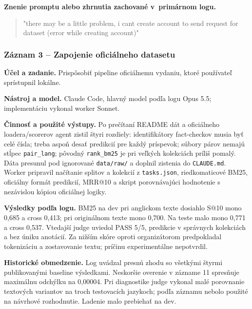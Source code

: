 \par\noindent\textbf{Znenie promptu alebo zhrnutia zachované v~primárnom logu.}

\begin{quote}\normalsize "there may be a little problem, i cant create account to send request for dataset (error while creating account)"\end{quote}

\subsubsection*{Záznam 3 -- Zapojenie oficiálneho datasetu}


\par\noindent \textbf{Účel a zadanie.} Prispôsobiť pipeline oficiálnemu vydaniu, ktoré používateľ sprístupnil lokálne.\par\smallskip
\par\noindent \textbf{Nástroj a model.} Claude Code, hlavný model podľa logu Opus 5.5; implementáciu vykonal worker Sonnet.\par\smallskip
\par\noindent \textbf{Činnosť a použité výstupy.} Po prečítaní README dát a oficiálneho loadera/scorerov agent zistil štyri rozdiely: identifikátory fact-checkov musia byť celé čísla; treba aspoň desať predikcií pre každý príspevok; súbory párov nemajú stĺpec \texttt{pair\_\allowbreak{}lang}; pôvodný \texttt{rank\_\allowbreak{}bm25} je pri veľkých kolekciách príliš pomalý. Dáta presunul pod ignorované \texttt{data/\allowbreak{}raw/\allowbreak{}} a doplnil zistenia do \texttt{CLAUDE.\allowbreak{}md}. Worker pripravil načítanie splitov a kolekcií z \texttt{tasks.\allowbreak{}json}, riedkomaticové BM25, oficiálny formát predikcií, MRR@10 a skript porovnávajúci hodnotenie s nezávislou kópiou oficiálnej logiky.\par\smallskip
\par\noindent \textbf{Výsledky podľa logu.} BM25 na dev pri anglickom texte dosiahlo S@10 mono 0,685 a cross 0,413; pri originálnom texte mono 0,700. Na teste malo mono 0,771 a cross 0,537. Vtedajší judge uviedol PASS 5/5, predikcie v správnych kolekciách a bez úniku anotácií. Za nižším skóre oproti organizátorom predpokladal tokenizáciu a zostavovanie textu; príčinu experimentálne nepotvrdil.\par\smallskip
\par\noindent \textbf{Historické obmedzenie.} Log uvádzal presnú zhodu so všetkými štyrmi publikovanými baseline výsledkami. Neskoršie overenie v zázname 11 spresňuje maximálnu odchýlku na 0,00004. Pri diagnostike judge vykonal malé porovnanie textových variantov na troch testovacích jazykoch; podľa záznamu nebolo použité na návrhové rozhodnutie. Ladenie malo prebiehať na dev.\par\smallskip

